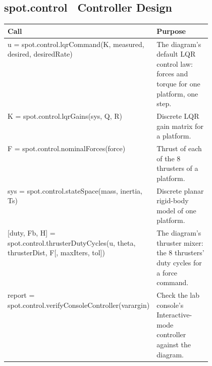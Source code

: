 \documentclass[11pt,a4paper]{article}
\begin{document}
\subsection*{spot.control \textmd{\textendash\ Controller Design}}
\begin{xltabular}{\linewidth}{@{}>{\raggedright\arraybackslash\ttfamily\footnotesize}p{0.47\linewidth} >{\raggedright\arraybackslash\small}X@{}}
\toprule \normalfont\small\textbf{Call} & \textbf{Purpose} \\ \midrule \endhead
u = spot.control.lqrCommand(K, measured, desired, desiredRate) & The diagram's default LQR control law: forces and torque for one platform, one step. \\
K = spot.control.lqrGains(sys, Q, R) & Discrete LQR gain matrix for a platform. \\
F = spot.control.nominalForces(force) & Thrust of each of the 8 thrusters of a platform. \\
sys = spot.control.stateSpace(mass, inertia, Ts) & Discrete planar rigid-body model of one platform. \\
{}[duty, Fb, H] = spot.control.thrusterDutyCycles(u, theta, thrusterDist, F[, maxIters, tol]) & The diagram's thruster mixer: the 8 thrusters' duty cycles for a force command. \\
report = spot.control.verifyConsoleController(varargin) & Check the lab console's Interactive-mode controller against the diagram. \\
\bottomrule\end{xltabular}
\end{document}
